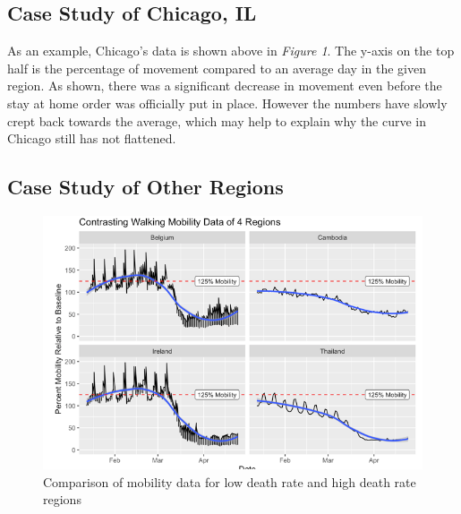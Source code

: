 \documentclass[11pt, english]{article}
\begin{document}
\subsection{Case Study of Chicago, IL}
As an example, Chicago’s data is shown above in \textit{Figure 1}. The y-axis on the top half is the percentage of movement compared to an average day in the given region. As shown, there was a significant decrease in movement even before the stay at home order was officially put in place. However the numbers have slowly crept back towards the average, which may help to explain why the curve in Chicago still has not flattened.
\newpage
\subsection{Case Study of Other Regions}

\begin{figure}[h!]
  \includegraphics[width=\linewidth]{image1.png}
  \caption{Comparison of mobility data for low death rate and high death rate regions}
  \label{fig:mobility}
\end{figure}
\end{document}
